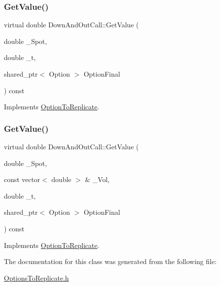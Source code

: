 \hypertarget{classDownAndOutCall_ab5855704cc4680238596427a115cb3e1}{}\label{classDownAndOutCall_ab5855704cc4680238596427a115cb3e1} 
\subsubsection{\texorpdfstring{Get\+Value()}{GetValue()}\hspace{0.1cm}{\footnotesize\ttfamily [1/2]}}
{\footnotesize\ttfamily virtual double Down\+And\+Out\+Call\+::\+Get\+Value (\begin{DoxyParamCaption}\item[{double}]{\+\_\+\+Spot,  }\item[{double}]{\+\_\+t,  }\item[{shared\+\_\+ptr$<$ Option $>$}]{Option\+Final }\end{DoxyParamCaption}) const\hspace{0.3cm}{\ttfamily [virtual]}}



Implements \hyperlink{classOptionToReplicate_a7f39f64594b4baffb45d61a65b38c6b2}{Option\+To\+Replicate}.

\hypertarget{classDownAndOutCall_a6ccfc2e5d77a48558087d4b9df914377}{}\label{classDownAndOutCall_a6ccfc2e5d77a48558087d4b9df914377} 
\subsubsection{\texorpdfstring{Get\+Value()}{GetValue()}\hspace{0.1cm}{\footnotesize\ttfamily [2/2]}}
{\footnotesize\ttfamily virtual double Down\+And\+Out\+Call\+::\+Get\+Value (\begin{DoxyParamCaption}\item[{double}]{\+\_\+\+Spot,  }\item[{const vector$<$ double $>$ \&}]{\+\_\+\+Vol,  }\item[{double}]{\+\_\+t,  }\item[{shared\+\_\+ptr$<$ Option $>$}]{Option\+Final }\end{DoxyParamCaption}) const\hspace{0.3cm}{\ttfamily [virtual]}}



Implements \hyperlink{classOptionToReplicate_a738f813473de4945df377bcd3fe17f6e}{Option\+To\+Replicate}.



The documentation for this class was generated from the following file\+:\begin{DoxyCompactItemize}
\item 
\hyperlink{OptionsToReplicate_8h}{Options\+To\+Replicate.\+h}\end{DoxyCompactItemize}
